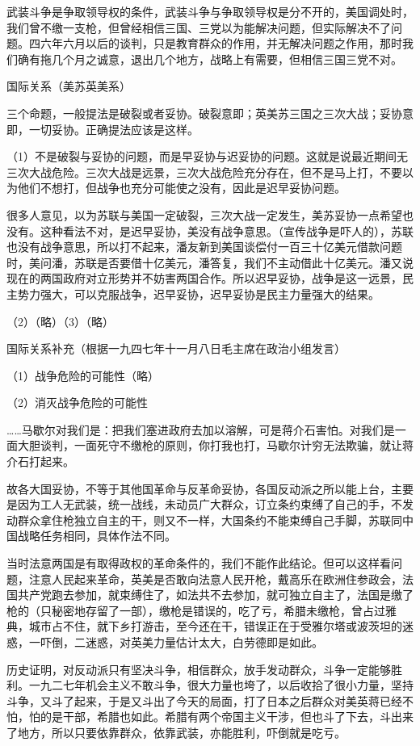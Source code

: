 武装斗争是争取领导权的条件，武装斗争与争取领导权是分不开的，美国调处时，我们曾不缴一支枪，但曾经相信三国、三党以为能解决问题，但实际解决不了问题。四六年六月以后的谈判，只是教育群众的作用，并无解决问题之作用，那时我们确有拖几个月之诚意，退出几个地方，战略上有需要，但相信三国三党不对。

国际关系（美苏英美系）

三个命题，一般提法是破裂或者妥协。破裂意即；英美苏三国之三次大战；妥协意即，一切妥协。正确提法应该是这样。

（1）不是破裂与妥协的问题，而是早妥协与迟妥协的问题。这就是说最近期间无三次大战危险。三次大战是远景，三次大战危险充分存在，但不是马上打，不要以为他们不想打，但战争也充分可能使之没有，因此是迟早妥协问题。


很多人意见，以为苏联与美国一定破裂，三次大战一定发生，美苏妥协一点希望也没有。这种看法不对，是迟早妥协，美没有战争意思。（宣传战争是吓人的），苏联也没有战争意思，所以打不起来，潘友新到美国谈偿付一百三十亿美元借款问题时，美问潘，苏联是否要借十亿美元，潘答复，我们不主动借此十亿美元。潘又说现在的两国政府对立形势并不妨害两国合作。所以迟早妥协，战争是这一远景，民主势力强大，可以克服战争，迟早妥协，迟早妥协是民主力量强大的结果。

（2）（略）（3）（略）

国际关系补充（根据一九四七年十一月八日毛主席在政治小组发言）

（1）战争危险的可能性（略）

（2）消灭战争危险的可能性

……马歇尔对我们是：把我们塞进政府去加以溶解，可是蒋介石害怕。对我们是一面大胆谈判，一面死守不缴枪的原则，你打我也打，马歇尔计穷无法欺骗，就让蒋介石打起来。

故各大国妥协，不等于其他国革命与反革命妥协，各国反动派之所以能上台，主要是因为工人无武装，统一战线，未动员广大群众，订立条约束缚了自己的手，不发动群众拿住枪独立自主的干，则又不一样，大国条约不能束缚自己手脚，苏联同中国战略任务相同，具体作法不同。

当时法意两国是有取得政权的革命条件的，我们不能作此结论。但可以这样看问题，注意人民起来革命，英美是否敢向法意人民开枪，戴高乐在欧洲住参政会，法国共产党跑去参加，就束缚住了，如法共不去参加，就可独立自主了，法国是缴了枪的（只秘密地存留了一部），缴枪是错误的，吃了亏，希腊未缴枪，曾占过雅典，城市占不住，就下乡打游击，至今还在干，错误正在于受雅尔塔或波茨坦的迷惑，一吓倒，二迷惑，对英美力量估计太大，白劳德即是如此。

历史证明，对反动派只有坚决斗争，相信群众，放手发动群众，斗争一定能够胜利。一九二七年机会主义不敢斗争，很大力量也垮了，以后收拾了很小力量，坚持斗争，又斗了起来，于是又斗出了今天的局面，打了日本之后群众对美英蒋已经不怕，怕的是干部，希腊也如此。希腊有两个帝国主义干涉，但也斗了下去，斗出来了地方，所以只要依靠群众，依靠武装，亦能胜利，吓倒就是吃亏。

